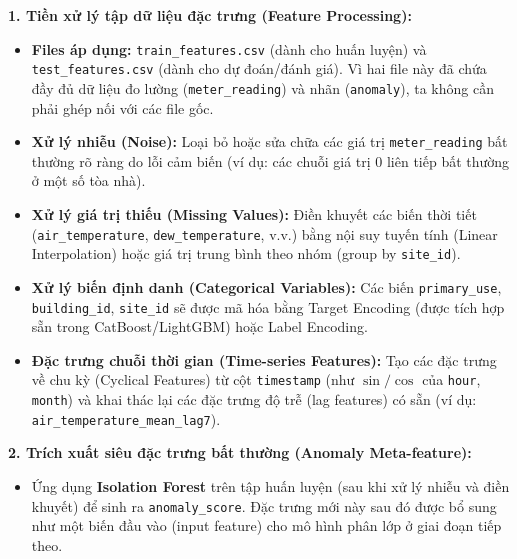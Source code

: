 \textbf{1. Tiền xử lý tập dữ liệu đặc trưng (Feature Processing):}
\begin{itemize}
    \item \textbf{Files áp dụng:} \texttt{train\_features.csv} (dành cho huấn luyện) và \texttt{test\_features.csv} (dành cho dự đoán/đánh giá). Vì hai file này đã chứa đầy đủ dữ liệu đo lường (\texttt{meter\_reading}) và nhãn (\texttt{anomaly}), ta không cần phải ghép nối với các file gốc.
    \item \textbf{Xử lý nhiễu (Noise):} Loại bỏ hoặc sửa chữa các giá trị \texttt{meter\_reading} bất thường rõ ràng do lỗi cảm biến (ví dụ: các chuỗi giá trị 0 liên tiếp bất thường ở một số tòa nhà).
    \item \textbf{Xử lý giá trị thiếu (Missing Values):} Điền khuyết các biến thời tiết (\texttt{air\_temperature}, \texttt{dew\_temperature}, v.v.) bằng nội suy tuyến tính (Linear Interpolation) hoặc giá trị trung bình theo nhóm (group by \texttt{site\_id}).
    \item \textbf{Xử lý biến định danh (Categorical Variables):} Các biến \texttt{primary\_use}, \texttt{building\_id}, \texttt{site\_id} sẽ được mã hóa bằng Target Encoding (được tích hợp sẵn trong CatBoost/LightGBM) hoặc Label Encoding.
    \item \textbf{Đặc trưng chuỗi thời gian (Time-series Features):} Tạo các đặc trưng về chu kỳ (Cyclical Features) từ cột \texttt{timestamp} (như $\sin/\cos$ của \texttt{hour}, \texttt{month}) và khai thác lại các đặc trưng độ trễ (lag features) có sẵn (ví dụ: \texttt{air\_temperature\_mean\_lag7}).
\end{itemize}

\textbf{2. Trích xuất siêu đặc trưng bất thường (Anomaly Meta-feature):}
\begin{itemize}
    \item Ứng dụng \textbf{Isolation Forest} trên tập huấn luyện (sau khi xử lý nhiễu và điền khuyết) để sinh ra \texttt{anomaly\_score}. Đặc trưng mới này sau đó được bổ sung như một biến đầu vào (input feature) cho mô hình phân lớp ở giai đoạn tiếp theo.
\end{itemize}

